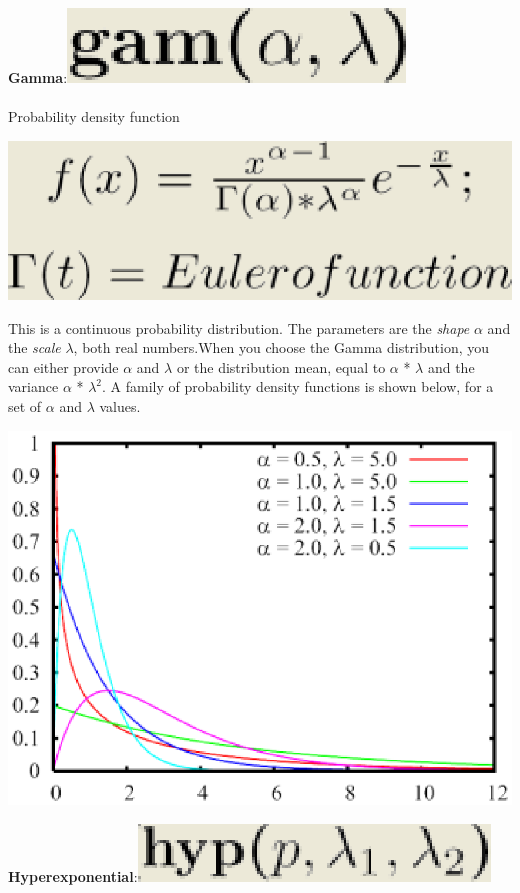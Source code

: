 \textbf{Gamma}:\includegraphics[scale=.5]{img/jsim/gamma_f.eps}\\\\
Probability density function\\
\begin{center}
\includegraphics[scale=.5]{img/jsim/gamma1.eps}
\end{center}
This is a continuous probability  distribution. The parameters are the \emph{shape} $\alpha$ and the \emph{scale} $\lambda$, both real numbers.When you choose the Gamma distribution, you can either provide $\alpha$ and $\lambda$ or the distribution mean, equal to $\alpha$ * $\lambda$   and the variance $\alpha$ * $\lambda ^ 2$.
A family of probability density functions is shown below, for a set of $\alpha$ and $\lambda$ values.
\begin{center}
\includegraphics[scale=.5]{img/jsim/gamma_pdf.eps}
\end{center}
\textbf{Hyperexponential}:\includegraphics[scale=.5]{img/jsim/huperexpon_f.eps}\\\\
